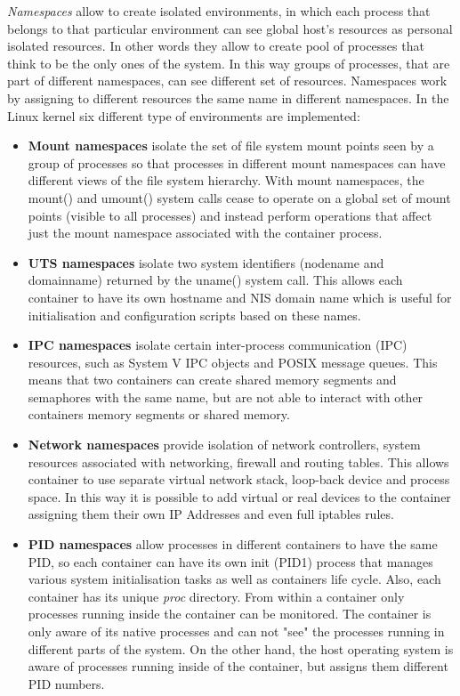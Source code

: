 \documentclass[a4paper,12pt]{article}
\begin{document}
\textit{Namespaces} allow to create isolated environments, in which each process
that belongs to that particular environment can see global host's resources as
personal isolated resources. In other words they allow to create pool of
processes that think to be the only ones of the system. In this way groups of
processes, that are part of different namespaces, can see different set of
resources. Namespaces work by assigning to different resources the same name in
different namespaces. In the Linux kernel six different type of environments are
implemented\cite{red_hat_introduction_to_namespaces}:
  \begin{itemize}
    \item \textbf{Mount namespaces} isolate the set of file system mount points
    seen by a group of processes so that processes in different mount namespaces
    can have different views of the file system hierarchy. With mount
    namespaces, the mount() and umount() system calls cease to operate on a
    global set of mount points (visible to all processes) and instead perform
    operations that affect just the mount namespace associated with the
    container process. 
    \item \textbf{UTS namespaces} isolate two system identifiers (nodename and
    domainname) returned by the uname() system call. This allows each container
    to have its own hostname and NIS domain name which is useful for
    initialisation and configuration scripts based on these names. 
    \item \textbf{IPC namespaces} isolate certain inter-process communication
    (IPC) resources, such as System V IPC objects and POSIX message queues. This
    means that two containers can create shared memory segments and semaphores
    with the same name, but are not able to interact with other containers
    memory segments or shared memory. 
    \item \textbf{Network namespaces} provide isolation of network controllers,
    system resources associated with networking, firewall and routing tables.
    This allows container to use separate virtual network stack, loop-back device
    and process space. In this way it is possible to add virtual or real devices
    to the container assigning them their own IP Addresses and even full iptables
    rules. 
    \item \textbf{PID namespaces} allow processes in different containers to
    have the same PID, so each container can have its own init (PID1) process
    that manages various system initialisation tasks as well as containers life
    cycle. Also, each container has its unique \textit{\/proc} directory. From
    within a container only processes running inside the container can be
    monitored. The container is only aware of its native processes and can not
    "see" the processes running in different parts of the system. On the other
    hand, the host operating system is aware of processes running inside of the
    container, but assigns them different PID numbers.
  \end{itemize} 
\end{document}
